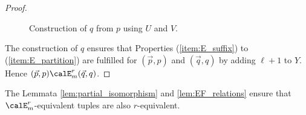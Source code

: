 \documentclass[a4paper,numberwithinsect,USenglish]{lipics-v2018}
\theoremstyle{plain}
\theoremstyle{remark}
\begin{document}
\begin{proof}
\begin{figure}[h]
\begin{center}
		\end{center}
		\caption{\label{fig:construction}Construction of $q$ from $p$ using $U$ and $V$.}
	\end{figure}
	The construction of $q$ ensures that Properties (\ref{item:E_suffix}) to (\ref{item:E_partition}) are fulfilled for $(\vec{p}, p)$ and $(\vec{q}, q)$ by adding $\ell+1$ to $Y$. Hence $(\vec{p}, p) \calE^r_m (\vec{q}, q)$.
\end{proof}

The Lemmata \ref{lem:partial_isomorphism} and \ref{lem:EF_relations} ensure that $\calE^r_m$-equivalent tuples are also $r$-equivalent.
\end{document}
